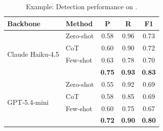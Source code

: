 \begin{table}[t]
  \centering
  \caption{Example: Detection performance on \benchname{}.}
  \label{tab:example}
  \footnotesize
  \begin{tabular}{@{}llccc@{}}
    \toprule
    Backbone & Method & P & R & F1 \\
    \midrule
    \multirow{4}{*}{Claude Haiku-4.5}
      & Zero-shot   & 0.58 & 0.96 & 0.73 \\
      & CoT         & 0.60 & 0.90 & 0.72 \\
      & Few-shot    & 0.63 & 0.78 & 0.70 \\
      & \toolname{} & \textbf{0.75} & \textbf{0.93} & \textbf{0.83} \\
    \midrule
    \multirow{4}{*}{GPT-5.4-mini}
      & Zero-shot   & 0.55 & 0.92 & 0.69 \\
      & CoT         & 0.58 & 0.85 & 0.69 \\
      & Few-shot    & 0.60 & 0.75 & 0.67 \\
      & \toolname{} & \textbf{0.72} & \textbf{0.90} & \textbf{0.80} \\
    \bottomrule
  \end{tabular}
\end{table}
